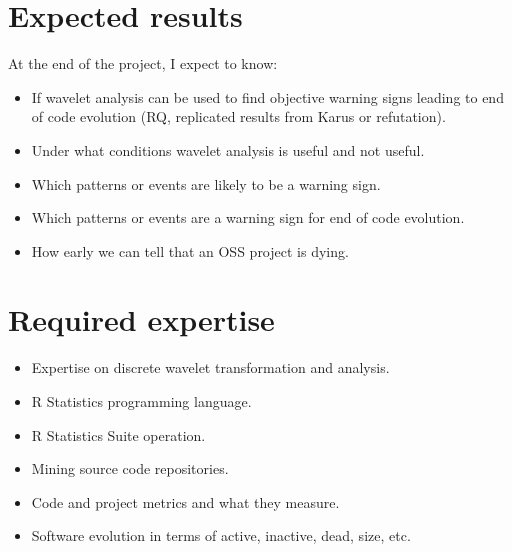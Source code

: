 


\section{Expected results}
At the end of the project, I expect to know:
\begin{itemize}
	\item If wavelet analysis can be used to find objective warning signs leading
	to end of code evolution (RQ, replicated results from Karus or refutation).
	\item Under what conditions wavelet analysis is useful and not useful.
	\item Which patterns or events are likely to be a warning sign.
	\item Which patterns or events are a warning sign for end of code evolution.
	\item How early we can tell that an OSS project is dying.
\end{itemize}

\section{Required expertise}
\begin{itemize}
	\item Expertise on discrete wavelet transformation and analysis.
	\item R Statistics programming language.
	\item R Statistics Suite operation.
	\item Mining source code repositories.
	\item Code and project metrics and what they measure.
	\item Software evolution in terms of active, inactive, dead, size, etc.
\end{itemize}

